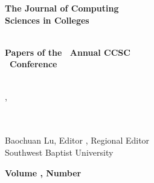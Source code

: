 \begin{textsf}

\begin{center}
\textbf{\Huge{
The Journal of Computing\\
Sciences in Colleges\\
}}\\
\end{center}

\vspace{10pt}
\vspace{10pt}
\vspace{10pt}

\begin{center}
\textbf{\Large{
Papers of the \confOrdinal\ Annual CCSC\\
\confName\ Conference\\
}}\\
\end{center}

\vspace{10pt}

\begingroup
\centering
\large{\confDates, \confYear}\\
\large{\confSchool}\\
\large{\confCity}\\
\endgroup

\vfill

{\parindent0pt
Baochuan Lu, Editor \hfill \regionalEditor, Regional Editor\\
Southwest Baptist University \hfill \regionalEditorSchool\\
}

\vspace{10pt}

{\parindent0pt
\textbf{\Large Volume \journalVolume, Number \journalNumber} \hfill
\textbf{\Large \journalMonth\ \journalYear}\\
}
\end{textsf}

